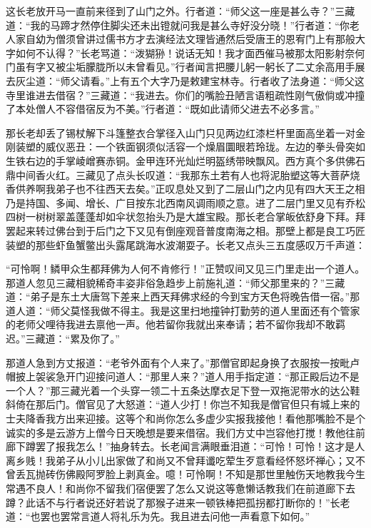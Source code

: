 \documentclass[12pt,UTF8]{ctexbook}
\begin{document}
{这长老放开马一直前来径到了山门之外。行者道：“师父这一座是甚么寺？”三藏道：“我的马蹄才然停住脚尖还未出镫就问我是甚么寺好没分晓！”行者道：“你老人家自幼为僧须曾讲过儒书方才去演经法文理皆通然后受唐王的恩宥门上有那般大字如何不认得？”长老骂道：“泼猢狲！说话无知！我才面西催马被那太阳影射奈何门虽有字又被尘垢朦胧所以未曾看见。”行者闻言把腰儿躬一躬长了二丈余高用手展去灰尘道：“师父请看。”上有五个大字乃是敕建宝林寺。行者收了法身道：“师父这寺里谁进去借宿？”三藏道：“我进去。你们的嘴脸丑陋言语粗疏性刚气傲倘或冲撞了本处僧人不容借宿反为不美。”行者道：“既如此请师父进去不必多言。”

那长老却丢了锡杖解下斗篷整衣合掌径入山门只见两边红漆栏杆里面高坐着一对金刚装塑的威仪恶丑：一个铁面钢须似活容一个燥眉圜眼若玲珑。左边的拳头骨突如生铁右边的手掌崚嶒赛赤铜。金甲连环光灿烂明盔绣带映飘风。西方真个多供佛石鼎中间香火红。三藏见了点头长叹道：“我那东土若有人也将泥胎塑这等大菩萨烧香供养啊我弟子也不往西天去矣。”正叹息处又到了二层山门之内见有四大天王之相乃是持国、多闻、增长、广目按东北西南风调雨顺之意。进了二层门里又见有乔松四树一树树翠盖蓬蓬却如伞状忽抬头乃是大雄宝殿。那长老合掌皈依舒身下拜。拜罢起来转过佛台到于后门之下又见有倒座观音普度南海之相。那壁上都是良工巧匠装塑的那些虾鱼蟹鳖出头露尾跳海水波潮耍子。长老又点头三五度感叹万千声道：

“可怜啊！鳞甲众生都拜佛为人何不肯修行！”正赞叹间又见三门里走出一个道人。那道人忽见三藏相貌稀奇丰姿非俗急趋步上前施礼道：“师父那里来的？”三藏道：“弟子是东土大唐驾下差来上西天拜佛求经的今到宝方天色将晚告借一宿。”那道人道：“师父莫怪我做不得主。我是这里扫地撞钟打勤劳的道人里面还有个管家的老师父哩待我进去禀他一声。他若留你我就出来奉请；若不留你我却不敢羁迟。”三藏道：“累及你了。”

那道人急到方丈报道：“老爷外面有个人来了。”那僧官即起身换了衣服按一按毗卢帽披上袈裟急开门迎接问道人：“那里人来？”道人用手指定道：“那正殿后边不是一个人？”那三藏光着一个头穿一领二十五条达摩衣足下登一双拖泥带水的达公鞋斜倚在那后门。僧官见了大怒道：“道人少打！你岂不知我是僧官但只有城上来的士夫降香我方出来迎接。这等个和尚你怎么多虚少实报我接他！看他那嘴脸不是个诚实的多是云游方上僧今日天晚想是要来借宿。我们方丈中岂容他打搅！教他往前廊下蹲罢了报我怎么！”抽身转去。长老闻言满眼垂泪道：“可怜！可怜！这才是人离乡贱！我弟子从小儿出家做了和尚又不曾拜谶吃荤生歹意看经怀怒坏禅心；又不曾丢瓦抛砖伤佛殿阿罗脸上剥真金。噫！可怜啊！不知是那世里触伤天地教我今生常遇不良人！和尚你不留我们宿便罢了怎么又说这等惫懒话教我们在前道廊下去蹲？此话不与行者说还好若说了那猴子进来一顿铁棒把孤拐都打断你的！”长老道：“也罢也罢常言道人将礼乐为先。我且进去问他一声看意下如何。”

}
\end{document}
